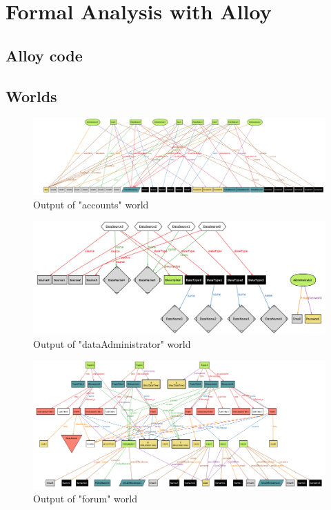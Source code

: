 \section{Formal Analysis with Alloy}

\subsection{Alloy code}

\newpage

\begin{landscape}
\subsection{Worlds}
\begin{figure}[h!]
    \centering
    \includegraphics[scale=0.3]{images/alloy/accounts.png}
    \caption{Output of "accounts" world}
    \label{fig:alloy_accounts}
\end{figure}
\begin{figure}[h!]
    \centering
    \includegraphics[scale=0.4]{images/alloy/dataAdministrator.png}
    \caption{Output of "dataAdministrator" world}
    \label{fig:alloy_data}
\end{figure}
\begin{figure}[h!]
    \centering
    \includegraphics[scale=0.65]{images/alloy/forum1.png}
    \caption{Output of "forum" world}
    \label{fig:alloy_forum}
\end{figure}
\end{landscape}